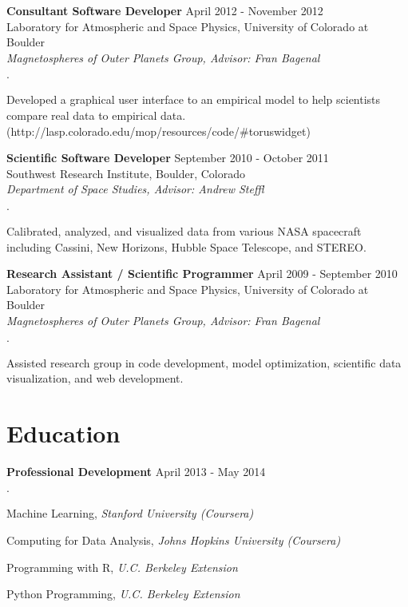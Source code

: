 \documentclass[margin,line]{res}
\newenvironment{list2}{
  \begin{list}{$\cdot$}{%
      \setlength{\itemsep}{0in}
      \setlength{\parsep}{0in} \setlength{\parskip}{0in}
      \setlength{\topsep}{0in} \setlength{\partopsep}{0in} 
      \setlength{\leftmargin}{0.2in}}}{\end{list}}
\begin{document}
\begin{resume}
{\bf Consultant Software Developer} \hfill {April 2012 - November 2012}\\
Laboratory for Atmospheric and Space Physics, University of Colorado at Boulder\\
{\em Magnetospheres of Outer Planets Group, Advisor: Fran Bagenal}
\begin{list2}
\item Developed a graphical user interface to an empirical model to help scientists compare real data to empirical data. (http://lasp.colorado.edu/mop/resources/code/\#toruswidget)
\end{list2}

{\bf Scientific Software Developer} \hfill {September 2010 - October 2011}\\
Southwest Research Institute, Boulder, Colorado\\
{\em Department of Space Studies, Advisor: Andrew Steffl}
\begin{list2}
\item Calibrated, analyzed, and visualized data from various NASA spacecraft including Cassini, New Horizons, Hubble Space Telescope, and STEREO.
\end{list2}

{\bf Research Assistant / Scientific Programmer} \hfill {April 2009 - September 2010}\\
Laboratory for Atmospheric and Space Physics, University of Colorado at Boulder\\
{\em Magnetospheres of Outer Planets Group, Advisor: Fran Bagenal}
\begin{list2}
\item Assisted research group in code development, model optimization, scientific data visualization, and web development.
\end{list2}


\section{\sc Education}

{\bf Professional Development} \hfill {April 2013 - May 2014}\\
\vspace*{-.15in}
\begin{list2}
\item Machine Learning, {\em Stanford University (Coursera)}
\item Computing for Data Analysis, {\em Johns Hopkins University (Coursera)}
\item Programming with R, {\em U.C. Berkeley Extension}
\item Python Programming, {\em U.C. Berkeley Extension}
\end{list2}


\end{resume}
\end{document}
